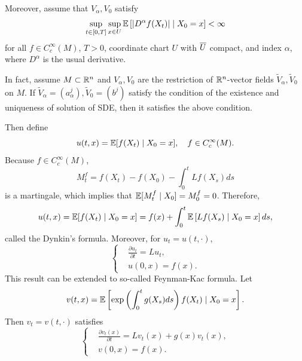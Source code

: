 Moreover, assume that $V_\alpha,V_0$ satisfy
\begin{equation*}
    \sup_{t \in [0,T]}\sup_{x \in U}\mathbb{E}\left[\left\lvert D^\alpha f(X_t)\right\lvert \mid X_0 = x\right] < \infty
\end{equation*}
for all $f \in C_c^\infty(M)$, $T > 0$, coordinate chart $U$ with $\overline{U}$ compact, and index $\alpha$, where $D^\alpha$ is the usual derivative.
\begin{rmk}
    In fact, assume $M \subset \mathbb{R}^n$ and $V_\alpha,V_0$ are the restriction of $\mathbb{R}^n$-vector fields $\tilde{V}_\alpha,\tilde{V}_0$ on $M$. If $\tilde{V}_\alpha = (a_\alpha^j),\tilde{V}_0 = (b^j)$ satisfy the condition of the existence and uniqueness of solution of SDE, then it satisfies the above condition.
\end{rmk}
Then define
\begin{equation*}
    u(t,x) = \mathbb{E}[f(X_t) \mid X_0 = x],\quad f \in C_c^\infty(M).
\end{equation*}
Because $f \in C_c^\infty(M)$,
\begin{equation*}
    M^f_t = f(X_t) - f(X_0) - \int_0^tLf(X_s)ds
\end{equation*}
is a martingale, which implies that $\mathbb{E}[M^f_t \mid X_0] = M^f_0 = 0$. Therefore,
\begin{equation*}
    u(t,x) = \mathbb{E}[f(X_t) \mid X_0 = x] = f(x) + \int_0^t\mathbb{E}\left[Lf(X_s) \mid X_0 = x\right]ds,
\end{equation*}
called the Dynkin's formula. Moreover, for $u_t = u(t,\cdot)$,
\begin{equation*}
    \left\{
        \begin{aligned}
            &\frac{\partial u_t}{\partial t} = Lu_t, \\
            &u(0,x) =f(x).
        \end{aligned}
    \right.
\end{equation*}
This result can be extended to so-called Feynman-Kac formula. Let
\begin{equation*}
    v(t,x) = \mathbb{E}\left[\exp\left(\int_0^tg(X_s)ds\right)f(X_t) \mid X_0 = x\right].
\end{equation*}
Then $v_t = v(t,\cdot)$ satisfies
\begin{equation*}
    \left\{
        \begin{aligned}
            &\frac{\partial v_t(x)}{\partial t} = Lv_t(x) + g(x)v_t(x), \\
            &v(0,x) =f(x).
        \end{aligned}
    \right.
\end{equation*}
